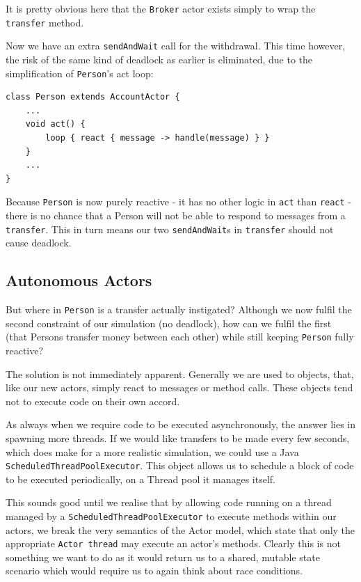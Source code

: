 \documentclass[a4paper,12pt]{kth-mag}
\begin{document}
It is pretty obvious here that the \texttt{Broker} actor exists simply to wrap the \texttt{transfer} method. 

Now we have an extra \texttt{sendAndWait} call for the withdrawal. This time however, the risk of the same kind of deadlock as earlier is eliminated, due to the simplification of \texttt{Person}'s act loop:

\begin{listing}[H]
	\begin{verbatim}
class Person extends AccountActor {
    ...
    void act() {
        loop { react { message -> handle(message) } }
    }
    ...
}
	\end{verbatim}
\end{listing}

Because \texttt{Person} is now purely reactive - it has no other logic in \texttt{act} than \texttt{react} - there is no chance that a Person will not be able to respond to messages from a \texttt{transfer}. This in turn means our two \texttt{sendAndWait}s in \texttt{transfer} should not cause deadlock.

\subsection{Autonomous Actors}

But where in \texttt{Person} is a transfer actually instigated? Although we now fulfil the second constraint of our simulation (no deadlock), how can we fulfil the first (that Persons transfer money between each other) while still keeping \texttt{Person} fully reactive?

The solution is not immediately apparent. Generally we are used to objects, that, like our new actors, simply react to messages or method calls. These objects tend not to execute code on their own accord. 

As always when we require code to be executed asynchronously, the answer lies in spawning more threads. If we would like transfers to be made every few seconds, which does make for a more realistic simulation, we could use a Java \texttt{ScheduledThreadPoolExecutor}. This object allows us to schedule a block of code to be executed periodically, on a Thread pool it manages itself.

This sounds good until we realise that by allowing code running on a thread managed by a \texttt{ScheduledThreadPoolExecutor} to execute methods within our actors, we break the very semantics of the Actor model, which state that only the appropriate \texttt{Actor thread} may execute an actor's methods. Clearly this is not something we want to do as it would return us to a shared, mutable state scenario which would require us to again think about race conditions.
\end{document}
